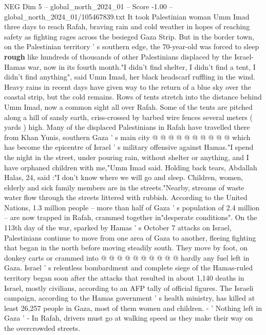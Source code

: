 \begin{textsample}{NEG Dim 5 – global\_north\_2024\_01 – Score -1.00 – global\_north\_2024\_01/105467839.txt}  \label{ex:f5_neg_344}
It took Palestinian woman Umm Imad three days to reach Rafah, braving rain and cold weather in hopes of reaching safety as fighting rages across the besieged Gaza Strip.
But in the border town, on the Palestinian territory ' s southern edge, the 70-year-old was forced to sleep \textbf{rough} like hundreds of thousands of other Palestinians displaced by the Israel-Hamas war, now in its fourth month."I didn't find shelter, I didn't find a tent, I didn't find anything", said Umm Imad, her black headscarf ruffling in the wind.
Heavy rains in recent days have given way to the return of a blue sky over the coastal strip, but the cold remains.
Rows of tents stretch into the distance behind Umm Imad, now a common sight all over Rafah.
Some of the tents are pitched along a hill of sandy earth, criss-crossed by barbed wire fences several meters ( yards ) high.
Many of the displaced Palestinians in Rafah have travelled there from Khan Yunis, southern Gaza ' s main city @ @ @ @ @ @ @ @ @ @ which has become the epicentre of Israel ' s military offensive against Hamas."I spend the night in the street, under pouring rain, without shelter or anything, and I have orphaned children with me,"Umm Imad said.
Holding back tears, Abdallah Halas, 24, said :"I don't know where we will go and sleep.
Children, women, elderly and sick family members are in the streets."Nearby, streams of waste water flow through the streets littered with rubbish.
According to the United Nations, 1.3 million people -- more than half of Gaza ' s population of 2.4 million -- are now trapped in Rafah, crammed together in"desperate conditions".
On the 113th day of the war, sparked by Hamas ' s October 7 attacks on Israel, Palestinians continue to move from one area of Gaza to another, fleeing fighting that began in the north before moving steadily south.
They move by foot, on donkey carts or crammed into @ @ @ @ @ @ @ @ @ @ hardly any fuel left in Gaza.
Israel ' s relentless bombardment and complete siege of the Hamas-ruled territory began soon after the attacks that resulted in about 1,140 deaths in Israel, mostly civilians, according to an AFP tally of official figures.
The Israeli campaign, according to the Hamas government ' s health ministry, has killed at least 26,257 people in Gaza, most of them women and children. - ' Nothing left in Gaza ' - In Rafah, drivers must go at walking speed as they make their way on the overcrowded streets.

\end{textsample}
